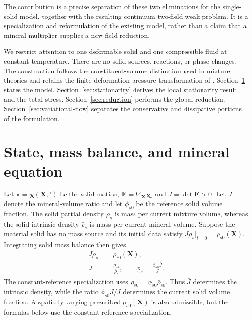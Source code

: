 \documentclass[11pt]{article}
\newcommand{\mbf}[1]{\mathbf{#1}}
\begin{document}
The contribution is a precise separation of these two eliminations for the
single-solid model, together with the resulting continuum two-field weak
problem.  It is a specialization and reformulation of the existing model,
rather than a claim that a mineral multiplier supplies a new field reduction.

We restrict attention to one deformable solid and one compressible fluid at
constant temperature.  There are no solid sources, reactions, or phase
changes.  The construction follows the constituent-volume distinction used
in mixture theories \citep{drumheller2000} and retains the finite-deformation
pressure transformation of \citet{fosterxu2025}.  Section~\ref{sec:state}
states the model.  Section~\ref{sec:stationarity} derives the local
stationarity result and the total stress.  Section~\ref{sec:reduction}
performs the global reduction.  Section~\ref{sec:variational-flow} separates
the conservative and dissipative portions of the formulation.

\section{State, mass balance, and mineral equation}
\label{sec:state}

Let \(\mbf x=\boldsymbol\chi(\mbf X,t)\) be the solid motion,
\(\mbf F=\nabla_{\mbf X}\boldsymbol\chi\), and \(J=\det\mbf F>0\).
Let \(\bar J\) denote the mineral-volume ratio and let \(\phi_{s0}\) be
the reference solid volume fraction.  The solid partial density \(\rho_s\)
is mass per current mixture volume, whereas the solid intrinsic density
\(\bar\rho_s\) is mass per current mineral volume.  Suppose the material
solid has no mass source and its initial data satisfy
\(J\rho_s|_{t=0}=\rho_{s0}(\mbf X)\).  Integrating solid mass balance then
gives
\begin{align}
 J\rho_s &= \rho_{s0}(\mbf X),
 \label{eq:solid-mass-integrated}\\
 \bar J &= \frac{\bar\rho_{s0}}{\bar\rho_s},
 \qquad
 \phi_s=\frac{\phi_{s0}\bar J}{J}.
 \label{eq:phase-volume-state}
\end{align}
The constant-reference specialization uses
\(\rho_{s0}=\phi_{s0}\bar\rho_{s0}\).  Thus \(\bar J\) determines the
intrinsic density, while the ratio \(\phi_{s0}\bar J/J\) determines the
current solid volume fraction.  A spatially varying prescribed
\(\rho_{s0}(\mbf X)\) is also admissible, but the formulas below use the
constant-reference specialization.
\end{document}
